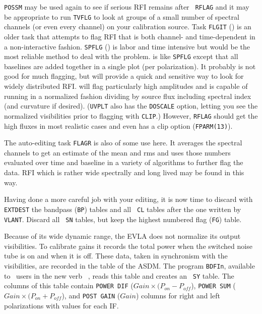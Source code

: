{\tt POSSM} may be used again to see if serious RFI remains after {\tt
RFLAG} and it may be appropriate to run {\tt TVFLG} to look at groups
of a small number of spectral channels (or even every channel) on your
calibration source.  Task {\tt FLGIT} () is an older
task that attempts to flag RFI that is both channel- and
time-dependent in a non-interactive fashion.  {\tt SPFLG}
() is labor and time intensive but would be the most
reliable method to deal with the problem.  {\tt {}} is like
{\tt SPFLG} except that all baselines are added together in a single
plot (per polarization).  It probably is not good for much flagging,
but will provide a quick and sensitive way to look for widely
distributed RFI\@.  {\tt {}} will flag particularly high
amplitudes and is capable of running in a normalized fashion dividing
by source flux including spectral index (and curvature if desired).
({\tt UVPLT} also has the {\tt DOSCALE} option, letting you see the
normalized visibilities prior to flagging with {\tt CLIP}\@.)
However, {\tt RFLAG} should get the high fluxes in most realistic
cases and even has a clip option ({\tt FPARM(13)})\@.

The auto-editing task {\tt FLAGR} is also of some use here.  It
averages the spectral channels to get an estimate of the mean and rms
and uses those numbers evaluated over time and baseline in a variety
of algorithms to further flag the data.  RFI which is rather wide
spectrally and long lived may be found in this way.


Having done a more careful job with your editing, it is now time to
discard with {\tt EXTDEST} the bandpass ({\tt BP}) tables and all {\tt
CL} tables after the one written by {\tt VLANT}\@.  Discard all {\tt
SN} tables, but keep the highest numbered flag ({\tt FG}) table.

Because of its wide dynamic range, the EVLA does not normalize its
output visibilities.  To calibrate gains it records the total power
when the switched noise tube is on and when it is off.  These data,
taken in synchronism with the visibilities, are recorded in the
 table of the ASDM\@.  The {\tt {}} program
{\tt BDFIn}, available to \AIPS\ users in the new verb {\tt
{}}, reads this table and creates an \AIPS\ {\tt SY}
table.  The columns of this table contain {\tt POWER DIF} ($Gain
\times (P_{on} - P_{off}$), {\tt POWER SUM} ($Gain \times (P_{on} +
P_{off}$), and {\tt POST GAIN} ($Gain$) columns for right and left
polarizations with values for each IF\@.

